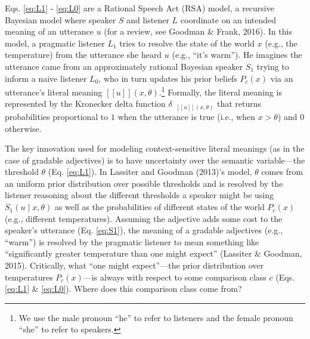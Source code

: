 \documentclass[doc]{apa6}
\begin{document}
Eqs. \ref{eq:L1} - \ref{eq:L0} are a Rational Speech Act (RSA) model, a
recursive Bayesian model where speaker \(S\) and listener \(L\)
coordinate on an intended meaning of an utterance \(u\) (for a review,
see Goodman \& Frank, 2016). In this model, a pragmatic listener \(L_1\)
tries to resolve the state of the world \(x\) (e.g., the temperature)
from the utterance she heard \(u\) (e.g., ``it's warm''). He
imagines the utterance came from an approximately rational Bayesian
speaker \(S_1\) trying to inform a naive listener \(L_0\), who in turn
updates his prior beliefs \(P_c(x)\) via an utterance's literal meaning
\([\![u]\!](x, \theta)\).\footnote{We use the male pronoun ``he''
  to refer to listeners and the female pronoun ``she'' to refer to
  speakers.} Formally, the literal meaning is represented by the
Kronecker delta function \(\delta_{\mbox{ $[\![ u ]\!]$}(x, \theta)}\)
that returns probabilities proportional to \(1\) when the utterance is
true (i.e., when \(x > \theta\)) and \(0\) otherwise.

The key innovation used for modeling context-sensitive literal meanings
(as in the case of gradable adjectives) is to have uncertainty over the
semantic variable---the threshold \(\theta\) (Eq. \ref{eq:L1}). In
Lassiter and Goodman (2013)'s model, \(\theta\) comes from an uniform
prior distribution over possible thresholds and is resolved by the
listener reasoning about the different thresholds a speaker might be
using \(S_{1}(u \mid x, \theta)\) as well as the probabilities of
different states of the world \(P_{c}(x)\) (e.g., different
temperatures). Assuming the adjective adds some cost to the speaker's
utterance (Eq. \ref{eq:S1}), the meaning of a gradable adjectives (e.g.,
``warm'') is resolved by the pragmatic listener to mean something
like ``significantly greater temperature than one might expect''
(Lassiter \& Goodman, 2015). Critically, what ``one might
expect''---the prior distribution over temperatures \(P_{c}(x)\)---is
always with respect to some comparison class \(c\) (Eqs. \ref{eq:L1} \&
\ref{eq:L0}). Where does this comparison class come from?
\end{document}
